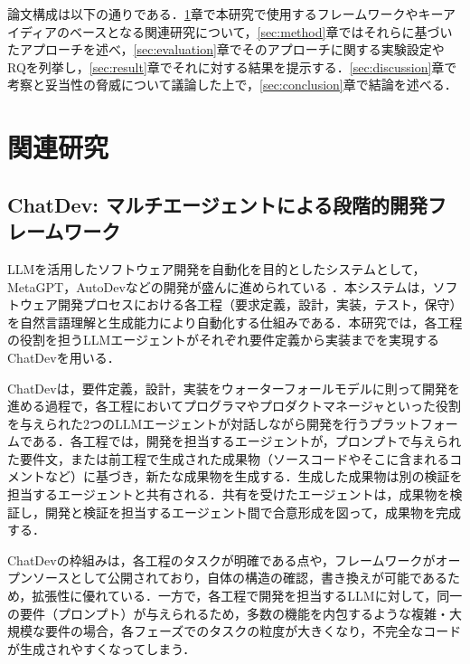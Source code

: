 \documentclass[submit,techrep,noauthor]{ipsj}
\begin{document}
論文構成は以下の通りである．\ref{sec:related}章で本研究で使用するフレームワークやキーアイディアのベースとなる関連研究について，\ref{sec:method}章ではそれらに基づいたアプローチを述べ，\ref{sec:evaluation}章でそのアプローチに関する実験設定やRQを列挙し，\ref{sec:result}章でそれに対する結果を提示する．\ref{sec:discussion}章で考察と妥当性の脅威について議論した上で，\ref{sec:conclusion}章で結論を述べる．


\section{関連研究}
\label{sec:related}

\subsection{ChatDev: マルチエージェントによる段階的開発フレームワーク}
LLMを活用したソフトウェア開発を自動化を目的としたシステムとして，MetaGPT，AutoDevなどの開発が盛んに進められている\cite{metagpt} \cite{autodev}．本システムは，ソフトウェア開発プロセスにおける各工程（要求定義，設計，実装，テスト，保守）を自然言語理解と生成能力により自動化する仕組みである．本研究では，各工程の役割を担うLLMエージェントがそれぞれ要件定義から実装までを実現するChatDev\cite{qian-etal-2024-chatdev}を用いる．

ChatDevは，要件定義，設計，実装をウォーターフォールモデルに則って開発を進める過程で，各工程においてプログラマやプロダクトマネージャといった役割を与えられた2つのLLMエージェントが対話しながら開発を行うプラットフォームである．各工程では，開発を担当するエージェントが，プロンプトで与えられた要件文，または前工程で生成された成果物（ソースコードやそこに含まれるコメントなど）に基づき，新たな成果物を生成する．生成した成果物は別の検証を担当するエージェントと共有される．共有を受けたエージェントは，成果物を検証し，開発と検証を担当するエージェント間で合意形成を図って，成果物を完成する．

ChatDevの枠組みは，各工程のタスクが明確である点や，フレームワークがオープンソースとして公開されており，自体の構造の確認，書き換えが可能であるため，拡張性に優れている．一方で，各工程で開発を担当するLLMに対して，同一の要件（プロンプト）が与えられるため，多数の機能を内包するような複雑・大規模な要件の場合，各フェーズでのタスクの粒度が大きくなり，不完全なコードが生成されやすくなってしまう．


\end{document}
